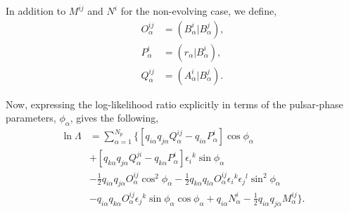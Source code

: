 \documentclass[twocolappendix,tighten]{emulateapj}
\begin{document}
In addition to $M^{ij}$ and $N^i$ for the non-evolving case, we define,
\begin{align}
O^{ij}_{\alpha} &= (B^i_{\alpha}|B^j_{\alpha}),\nonumber\\
P^i_{\alpha} &= (r_{\alpha}|B^i_{\alpha}),\nonumber\\
Q^{ij}_{\alpha} &= (A^i_{\alpha}|B^j_{\alpha}).
\end{align}

Now, expressing the log-likelihood ratio explicitly in terms of the pulsar-phase parameters, $\phi_{\alpha}$, gives the following,
\begin{align}
\ln\Lambda& = \sum_{\alpha=1}^{N_p} \Big\{\left[q_{i\alpha}q_{j\alpha}Q_{\alpha}^{ij} - q_{i\alpha}P_{\alpha}^i\right]\cos\phi_{\alpha} \nonumber\\
&+ \left[q_{k\alpha}q_{j\alpha}Q_{\alpha}^{ji} - q_{k\alpha}P_{\alpha}^i\right]\epsilon_i{}^k\sin\phi_{\alpha} \nonumber\\
&- \frac{1}{2}q_{i\alpha}q_{j\alpha}O_{\alpha}^{ij}\cos^2\phi_{\alpha} - \frac{1}{2}q_{k\alpha}q_{l\alpha}O_{\alpha}^{ij}\epsilon_i{}^k\epsilon_j{}^l\sin^2\phi_{\alpha} \nonumber\\
&- q_{i\alpha}q_{k\alpha}O_{\alpha}^{ij}\epsilon_j{}^k\sin\phi_{\alpha}\cos\phi_{\alpha} + q_{i\alpha}N_{\alpha}^i - \frac{1}{2}q_{i\alpha}q_{j\alpha}M_{\alpha}^{ij}\Big\}.
\end{align}
\end{document}

